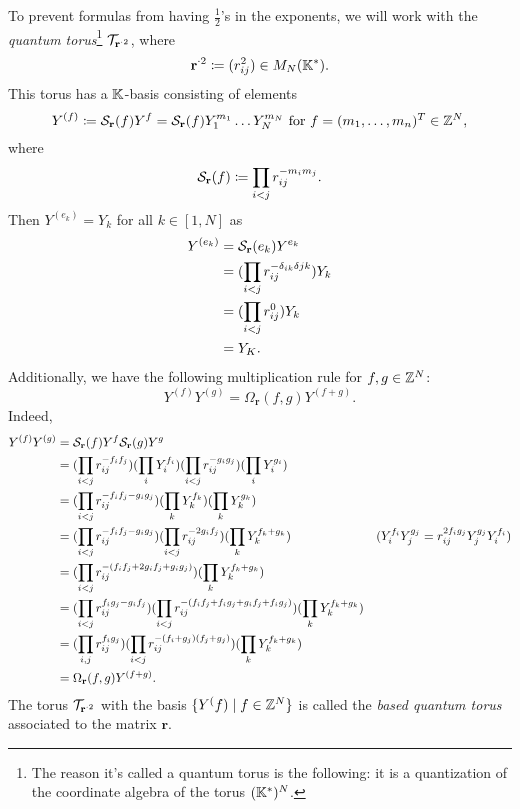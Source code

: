 \documentclass{article}
\begin{document}
To prevent formulas from having $\frac{1}{2}$'s in the exponents, we will work with the
\emph{quantum torus}\footnote{ The reason it's called a quantum torus is the following:
	it is a quantization of the coordinate algebra of the torus $(\mathbb{K}^{*})^N$. }
$\mathcal{T}_{\mathbf{r}^{\cdot 2}}$, where
\begin{equation*}
	\mathbf{r}^{\cdot 2} \coloneq (r_{ij}^2) \in M_N(\mathbb{K}^*).
\end{equation*}
This torus has a $\mathbb{K}$-basis consisting of elements
\begin{equation*}
	Y^{(f)} \coloneq \mathcal{S}_{\mathbf{r}}(f)Y^f = \mathcal{S}_{\mathbf{r}}(f)Y_1^{m_1}\dots Y_N^{m_N}
	\text{ for } f = (m_1, \dots, m_n)^T \in \mathbb{Z}^N,
\end{equation*}
where
\begin{equation*}
	\mathcal{S}_{\mathbf{r}}(f) \coloneq \prod_{i < j}r_{ij}^{-m_im_j}.
\end{equation*}
Then $Y^{(e_k)} = Y_k$ for all $k \in [1, N]$ as
\begin{align*}
	Y^{(e_k)}
	 & = \mathcal{S}_{\mathbf{r}}(e_k)Y^{e_k}                      \\
	 & = (\prod_{i < j}r_{ij}^{-\delta_{ik}\delta{jk}} )Y_k \\
	 & = (\prod_{i < j}r_{ij}^0 )Y_k                        \\
	 & = Y_K.
\end{align*}
Additionally, we have the following multiplication rule for $f,g \in \mathbb{Z}^N$:
\begin{equation*}
	Y^{(f)}Y^{(g)} = \Omega_{\mathbf{r}}(f,g)Y^{(f+g)}.
\end{equation*}
Indeed,
\begin{align*}
	Y^{(f)}Y^{(g)}
	 & = \mathcal{S}_{\mathbf{r}}(f)Y^f\mathcal{S}_{\mathbf{r}}(g)Y^g                                    \\
	 & = (\prod_{i < j}r_{ij}^{-f_if_j})(\prod_{i}Y_i^{f_i})
	(\prod_{i < j}r_{ij}^{-g_ig_j})( \prod_{i}Y_i^{g_i})                                   \\
	 & = (\prod_{i < j}r_{ij}^{-f_if_j - g_ig_j})
	(\prod_{k}Y_k^{f_k})(\prod_{k}Y_k^{g_k})                                               \\
	 & = (\prod_{i < j}r_{ij}^{-f_if_j - g_ig_j})
	(\prod_{i < j}r_{ij}^{-2g_if_j})(\prod_{k}Y_k^{f_k + g_k})
	 & (Y_i^{f_i} Y_j^{g_j} = r_{ij}^{2f_ig_j}Y_j^{g_j}Y_i^{f_i})                          \\
	 & = (\prod_{i < j}r_{ij}^{-(f_if_j +2g_if_j + g_ig_j)})
	(\prod_{k}Y_k^{f_k + g_k})                                                             \\
	 & = (\prod_{i < j}r_{ij}^{f_ig_j - g_if_j})
	(\prod_{i < j}r_{ij}^{-(f_if_j + f_ig_j + g_if_j + f_ig_j)})(\prod_{k}Y_k^{f_k + g_k}) \\
	 & = (\prod_{i,j}r_{ij}^{f_ig_j})
	(\prod_{i < j}r_{ij}^{-(f_i + g_j)(f_j + g_j)})(\prod_{k}Y_k^{f_k + g_k})              \\
	 & = \Omega_{\mathbf{r}}(f,g)Y^{(f + g)}.
\end{align*}
The torus $\mathcal{T}_{\mathbf{r}^{\cdot 2}}$ with the basis $\{Y^(f) \mid f \in \mathbb{Z}^N\}$
is called the \emph{based quantum torus} associated to the matrix $\mathbf{r}$.
\end{document}
